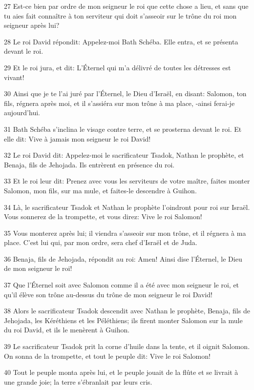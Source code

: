 \par 27 Est-ce bien par ordre de mon seigneur le roi que cette chose a lieu, et sans que tu aies fait connaître à ton serviteur qui doit s'asseoir sur le trône du roi mon seigneur après lui?
\par 28 Le roi David répondit: Appelez-moi Bath Schéba. Elle entra, et se présenta devant le roi.
\par 29 Et le roi jura, et dit: L'Éternel qui m'a délivré de toutes les détresses est vivant!
\par 30 Ainsi que je te l'ai juré par l'Éternel, le Dieu d'Israël, en disant: Salomon, ton fils, régnera après moi, et il s'assiéra sur mon trône à ma place, -ainsi ferai-je aujourd'hui.
\par 31 Bath Schéba s'inclina le visage contre terre, et se prosterna devant le roi. Et elle dit: Vive à jamais mon seigneur le roi David!
\par 32 Le roi David dit: Appelez-moi le sacrificateur Tsadok, Nathan le prophète, et Benaja, fils de Jehojada. Ils entrèrent en présence du roi.
\par 33 Et le roi leur dit: Prenez avec vous les serviteurs de votre maître, faites monter Salomon, mon fils, sur ma mule, et faites-le descendre à Guihon.
\par 34 Là, le sacrificateur Tsadok et Nathan le prophète l'oindront pour roi sur Israël. Vous sonnerez de la trompette, et vous direz: Vive le roi Salomon!
\par 35 Vous monterez après lui; il viendra s'asseoir sur mon trône, et il régnera à ma place. C'est lui qui, par mon ordre, sera chef d'Israël et de Juda.
\par 36 Benaja, fils de Jehojada, répondit au roi: Amen! Ainsi dise l'Éternel, le Dieu de mon seigneur le roi!
\par 37 Que l'Éternel soit avec Salomon comme il a été avec mon seigneur le roi, et qu'il élève son trône au-dessus du trône de mon seigneur le roi David!
\par 38 Alors le sacrificateur Tsadok descendit avec Nathan le prophète, Benaja, fils de Jehojada, les Kéréthiens et les Péléthiens; ils firent monter Salomon sur la mule du roi David, et ils le menèrent à Guihon.
\par 39 Le sacrificateur Tsadok prit la corne d'huile dans la tente, et il oignit Salomon. On sonna de la trompette, et tout le peuple dit: Vive le roi Salomon!
\par 40 Tout le peuple monta après lui, et le peuple jouait de la flûte et se livrait à une grande joie; la terre s'ébranlait par leurs cris.
